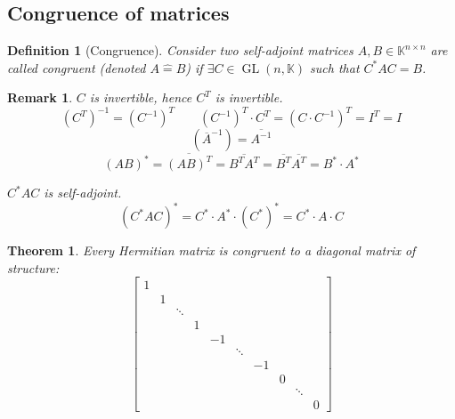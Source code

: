 \documentclass{article}
\newtheorem{theorem}{Theorem}  \numberwithin{theorem}{section}
\newtheorem{definition}{Definition}  \numberwithin{definition}{section}
\newtheorem{remark}{Remark}  \numberwithin{remark}{section}
\begin{document}
\subsection{Congruence of matrices}

\begin{definition}[Congruence] %
  Consider two self-adjoint matrices $A, B \in \mathbb K^{n \times n}$ are called congruent (denoted $A \hat= B$)
  if $\exists C \in \operatorname{GL}(n, \mathbb K)$ such that $C^* AC = B$.
\end{definition}

\begin{remark}
  $C$ is invertible, hence $C^T$ is invertible.
  \[ (C^T)^{-1} = (C^{-1})^T \qquad (C^{-1})^T \cdot C^T = (C \cdot C^{-1})^T = I^T = I \]
  \[ (\overline{A}^{-1}) = \overline{A^{-1}} \]
  \[ (AB)^* = \overline{(AB)^T} = \overline{B^T A^T} = \overline{B^T} \overline{A^T} = B^* \cdot A^* \]

  $C^* AC$ is self-adjoint.
  \[ (C^* AC)^* = C^* \cdot A^* \cdot (C^*)^* = C^* \cdot A \cdot C \]
\end{remark}

\begin{theorem} %
  Every Hermitian matrix is congruent to a diagonal matrix of structure:
  \[
    \begin{bmatrix}
      1 &   &        &    &    &        &    &   &        & \\
        & 1 &        &    &    &        &    &   &        & \\
        &   & \ddots &    &    &        &    &   &        & \\
        &   &        & 1  &    &        &    &   &        & \\
        &   &        &    & -1 &        &    &   &        & \\
        &   &        &    &    & \ddots &    &   &        & \\
        &   &        &    &    &        & -1 &   &        & \\
        &   &        &    &    &        &    & 0 &        & \\
        &   &        &    &    &        &    &   & \ddots & \\
        &   &        &    &    &        &    &   &        & 0
    \end{bmatrix}
  \]
\end{theorem}
\end{document}

